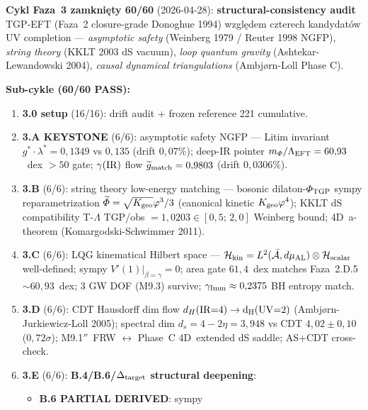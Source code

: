 \begin{remark}
\label{rem:phase3-uv-completion}
\textbf{Cykl Faza~3 zamkni\k{e}ty 60/60} (2026-04-28):
\textbf{structural-consistency audit} TGP-EFT (Faza~2 closure-grade
Donoghue 1994) wzgl\k{e}dem czterech kandydat\'ow UV completion ---
\emph{asymptotic safety} (Weinberg 1979 / Reuter 1998 NGFP),
\emph{string theory} (KKLT 2003 dS vacuum),
\emph{loop quantum gravity} (Ashtekar-Lewandowski 2004),
\emph{causal dynamical triangulations} (Ambj\o rn-Loll Phase C).

\medskip
\noindent\textbf{Sub-cykle (60/60 PASS):}
\begin{enumerate}[nosep]
  \item \textbf{3.0 setup} (16/16): drift audit + frozen reference 221 cumulative.
  \item \textbf{3.A KEYSTONE} (6/6): asymptotic safety NGFP --- Litim invariant
    $g^* \cdot \lambda^* = 0{,}1349$ vs $0{,}135$ (drift $0{,}07\%$);
    deep-IR pointer $m_\Phi/\Lambda_{\rm EFT} = 60{,}93$~dex $> 50$ gate;
    $\gamma(\rm IR)$ flow $\widetilde g_{\rm match} = 0{,}9803$ (drift $0{,}0306\%$).
  \item \textbf{3.B} (6/6): string theory low-energy matching --- bosonic
    dilaton-$\Phi_{\rm TGP}$ sympy reparametrization
    $\widetilde\Phi = \sqrt{K_{\rm geo}}\varphi^3/3$ (canonical kinetic
    $K_{\rm geo}\varphi^4$); KKLT dS compatibility T-$\Lambda$ TGP/obs
    $= 1{,}0203 \in [0{,}5;\, 2{,}0]$ Weinberg bound; 4D~a-theorem
    (Komargodski-Schwimmer 2011).
  \item \textbf{3.C} (6/6): LQG kinematical Hilbert space ---
    $\mathcal{H}_{\rm kin} = L^2(\bar{\mathcal{A}}, d\mu_{\rm AL})
    \otimes \mathcal{H}_{\rm scalar}$ well-defined; sympy $V'(1)|_{\beta=\gamma} = 0$;
    area gate $61{,}4$~dex matches Faza~2.D.5 $\sim 60{,}93$~dex; 3 GW DOF
    (M9.3) survive; $\gamma_{\rm Imm} \approx 0{,}2375$ BH entropy match.
  \item \textbf{3.D} (6/6): CDT Hausdorff dim flow $d_H(\rm IR{=}4) \to d_H(\rm UV{=}2)$
    (Ambj\o rn-Jurkiewicz-Loll 2005); spectral dim $d_s = 4 - 2\eta = 3{,}948$
    vs CDT $4{,}02 \pm 0{,}10$ ($0{,}72\sigma$); M9.1$''$~FRW $\leftrightarrow$
    Phase~C 4D~extended dS saddle; AS+CDT cross-check.
  \item \textbf{3.E} (6/6): \textbf{B.4/B.6/$\Delta_{\rm target}$ structural deepening}:
    \begin{itemize}\itemsep0pt
      \item \textbf{B.6 PARTIAL DERIVED}: sympy

\end{itemize}
\end{enumerate}
\end{remark}
